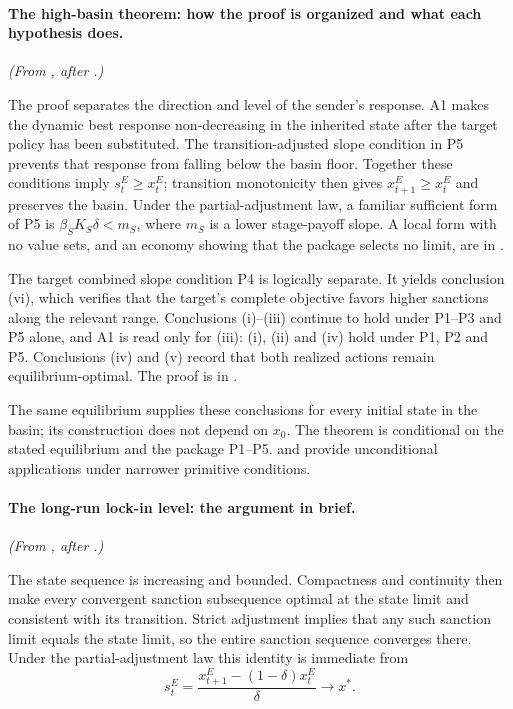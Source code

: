 \paragraph{The high-basin theorem: how the proof is organized and what each hypothesis does.} \emph{(From , after .)}

The proof separates the direction and level of the sender's response.
A1 makes the dynamic best response non-decreasing in the inherited state
after the target policy has been substituted. The transition-adjusted
slope condition in P5 prevents that response from falling below the basin floor.
Together these conditions imply $s_t^E\ge x_t^E$; transition
monotonicity then gives $x_{t+1}^E\ge x_t^E$ and preserves the basin.
Under the partial-adjustment law, a familiar sufficient form of P5 is
$\beta_SK_S\delta<m_S$, where $m_S$ is a lower stage-payoff slope. A local form
with no value sets, and an economy showing that the package selects no limit, are
in .

The target combined slope condition P4 is logically separate. It yields conclusion (vi),
which verifies that the target's complete objective favors higher
sanctions along the relevant range. Conclusions (i)--(iii) continue to
hold under P1--P3 and P5 alone, and A1 is read only for (iii): (i), (ii)
and (iv) hold under P1, P2 and P5. Conclusions (iv) and (v) record that both
realized actions remain equilibrium-optimal. The proof is in
.

The same equilibrium supplies these conclusions for every initial state
in the basin; its construction does not depend on $x_0$. The theorem is
conditional on the stated equilibrium and the package P1--P5.
 and 
provide unconditional applications under narrower primitive
conditions.

\paragraph{The long-run lock-in level: the argument in brief.} \emph{(From , after .)}

The state sequence is increasing and bounded. Compactness and continuity
then make every convergent sanction subsequence optimal at the state
limit and consistent with its transition. Strict adjustment implies
that any such sanction limit equals the state limit, so the entire
sanction sequence converges there. Under the partial-adjustment law this identity is
immediate from
\[
s^E_t=\frac{x^E_{t+1}-(1-\delta)x^E_t}{\delta}
\longrightarrow x^\ast.
\]

